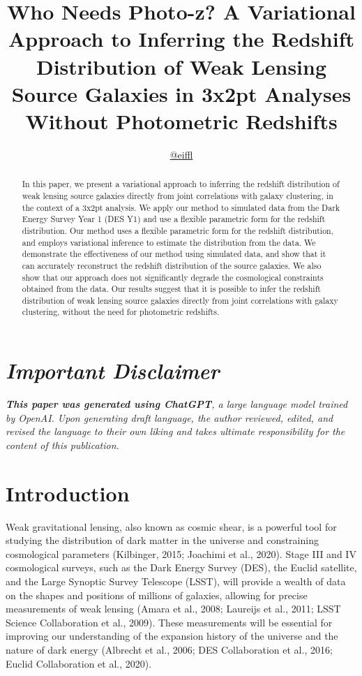 \documentclass[twocolumn]{aastex631}
\begin{document}
\title{Who Needs Photo-z? A Variational Approach to Inferring the Redshift Distribution of Weak Lensing Source Galaxies in 3x2pt Analyses Without Photometric Redshifts}

\author{\href{https://github.com/EiffL}{@eiffl}}

\begin{abstract}
In this paper, we present a variational approach to inferring the redshift distribution of weak lensing source galaxies directly from joint correlations with galaxy clustering, in the context of a 3x2pt analysis. We apply our method to simulated data from the Dark Energy Survey Year 1 (DES Y1) and use a flexible parametric form for the redshift distribution. Our method uses a flexible parametric form for the redshift distribution, and employs variational inference to estimate the distribution from the data. We demonstrate the effectiveness of our method using simulated data, and show that it can accurately reconstruct the redshift distribution of the source galaxies. We also show that our approach does not significantly degrade the cosmological constraints obtained from the data. Our results suggest that it is possible to infer the redshift distribution of weak lensing source galaxies directly from joint correlations with galaxy clustering, without the need for photometric redshifts.
\end{abstract}

\section*{\textit{\textbf{Important Disclaimer}}}
\textit{\textbf{This paper was generated using ChatGPT}, a large language model trained by OpenAI. Upon generating draft language, the author reviewed, edited, and revised the language to their own liking and takes ultimate responsibility for the content of this publication.}


\section{Introduction}
\label{sec:intro}

Weak gravitational lensing, also known as cosmic shear, is a powerful tool for studying the distribution of dark matter in the universe and constraining cosmological parameters (Kilbinger, 2015; Joachimi et al., 2020). Stage III and IV cosmological surveys, such as the Dark Energy Survey (DES), the Euclid satellite, and the Large Synoptic Survey Telescope (LSST), will provide a wealth of data on the shapes and positions of millions of galaxies, allowing for precise measurements of weak lensing (Amara et al., 2008; Laureijs et al., 2011; LSST Science Collaboration et al., 2009). These measurements will be essential for improving our understanding of the expansion history of the universe and the nature of dark energy (Albrecht et al., 2006; DES Collaboration et al., 2016; Euclid Collaboration et al., 2020).
\end{document}
